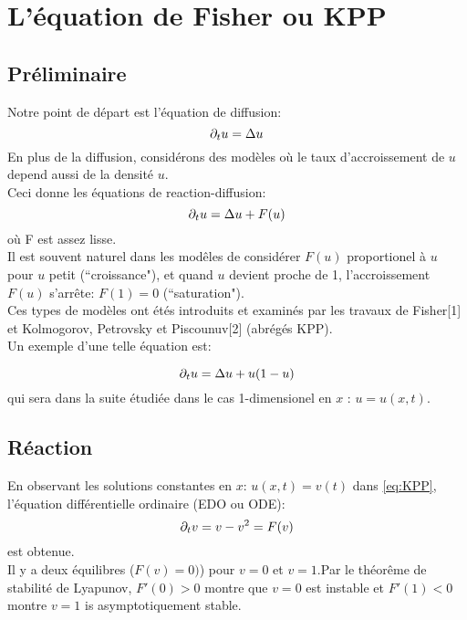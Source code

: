 

%


\section{L'équation de Fisher ou KPP}
\subsection{Préliminaire}
Notre point de départ est l'équation de diffusion:\begin{equation}\partial_t u = \Delta u  \end{equation}
En plus de la diffusion, considérons des modèles où le taux d'accroissement de $u$ depend aussi de la densité $u$.\\
Ceci donne les équations de reaction-diffusion:
\begin{equation}\partial_t u = \Delta u + F(u) \label{eq:ReaDi} \end{equation} 
où F est assez lisse.\\
Il est souvent naturel dans les modêles de considérer $F(u)$ proportionel à  $u$ pour $u$ petit (``croissance"), et quand $u$ devient proche de 1, l'accroissement $F(u)$ s'arrête: $F(1)=0$ (``saturation").\\
Ces types de modèles ont étés introduits et examinés par les travaux de Fisher[1] et Kolmogorov, Petrovsky et Piscounuv[2] (abrégés KPP).\\
Un exemple d'une telle équation est:

\begin{equation}
	\partial_t u = \Delta u +u(1-u) \label{eq:KPP}
\end{equation}
qui sera dans la suite étudiée dans le cas 1-dimensionel en $x$ : $u=u(x,t)$.

\subsection{Réaction}
En observant les solutions constantes en $x$: $u(x,t)=v(t)$ dans \eqref{eq:KPP}, l'équation différentielle ordinaire (EDO ou ODE): \begin{equation}
	\partial_t v = v - v^2 = F(v)
\end{equation}
est obtenue. \\
Il y a deux équilibres ($F(v)=0)$) pour $v=0$ et $v=1$.Par le théorême de stabilité de Lyapunov, $F'(0)>0$ montre que $v=0$ est instable et $F'(1)<0$ montre $v=1$ is asymptotiquement stable.

